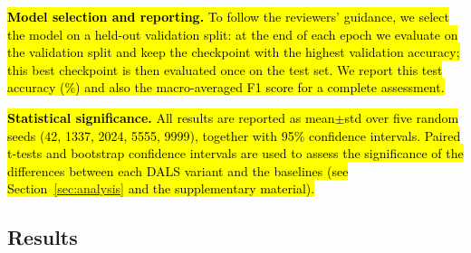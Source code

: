 \documentclass[a4paper,fleqn]{cas-dc}
\begin{document}
\hl{\textbf{Model selection and reporting.} To follow the reviewers' guidance, we select the model on a held-out validation split: at the end of each epoch we evaluate on the validation split and keep the checkpoint with the highest validation accuracy; this best checkpoint is then evaluated once on the test set. We report this test accuracy (\%) and also the macro-averaged F1 score for a complete assessment.}

\hl{\textbf{Statistical significance.} All results are reported as mean$\pm$std over five random seeds (42, 1337, 2024, 5555, 9999), together with 95\% confidence intervals. Paired t-tests and bootstrap confidence intervals are used to assess the significance of the differences between each DALS variant and the baselines (see Section~\mbox{\ref{sec:analysis}} and the supplementary material).}

\subsection{Results}
\end{document}
